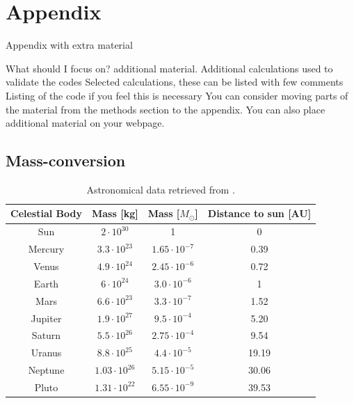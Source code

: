 \documentclass{article}
\begin{document}
\vspace{1cm}


\appendix
\section{Appendix} \label{sec:Appendix}

Appendix with extra material


What should I focus on? additional material.
Additional calculations used to validate the codes
Selected calculations, these can be listed with few comments
Listing of the code if you feel this is necessary
You can consider moving parts of the material from the methods section to the appendix. You can also place additional material on your webpage.

\subsection{Mass-conversion} \label{app:mass}


    \begin{table}[H]
        \centering
        \caption{Astronomical data retrieved from \cite{solarsystemdata}. }
        \vspace{2mm}
        \label{tab:mass}
        \begin{tabular}{|c|c|c|c|}
            \hline
            Celestial Body & Mass [kg] & Mass [$M_{\odot}$] & Distance to sun [AU]\\
            \hline \hline
            Sun     & $ 2    \cdot10^{30} $ & 1                    & 0 \\
            Mercury & $ 3.3  \cdot10^{23} $ & $1.65 \cdot 10^{-7}$ & 0.39 \\
            Venus   & $ 4.9  \cdot10^{24} $ & $2.45 \cdot 10^{-6}$ & 0.72 \\
            Earth   & $ 6    \cdot10^{24} $ & $3.0 \cdot 10^{-6}$  & 1 \\
            Mars    & $ 6.6  \cdot10^{23} $ & $3.3 \cdot 10^{-7}$  & 1.52 \\
            Jupiter & $ 1.9  \cdot10^{27} $ & $9.5 \cdot 10^{-4}$  & 5.20 \\
            Saturn  & $ 5.5  \cdot10^{26} $ & $2.75 \cdot 10^{-4}$ & 9.54 \\
            Uranus  & $ 8.8  \cdot10^{25} $ & $4.4 \cdot 10^{-5}$  & 19.19 \\
            Neptune & $ 1.03 \cdot10^{26} $ & $5.15 \cdot 10^{-5}$ & 30.06 \\
            Pluto   & $ 1.31 \cdot10^{22} $ & $6.55 \cdot 10^{-9}$ & 39.53 \\
            \hline
        \end{tabular} \\
        \hspace{0pt}\\
    \end{table}
\end{document}
